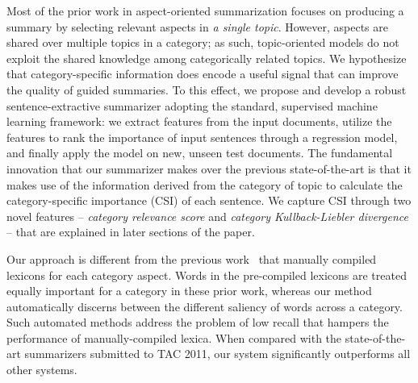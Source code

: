 Most of the prior work in aspect-oriented summarization focuses on producing a summary by selecting relevant aspects in \emph{a single topic}. However, aspects are shared over multiple topics in a category; as such, topic-oriented models do not exploit the shared knowledge among categorically related topics. We hypothesize that category-specific information does encode a useful signal that can improve the quality of guided summaries. To this effect, we propose and develop a robust sentence-extractive summarizer adopting the standard, supervised machine learning framework: we extract features from the input documents, utilize the features to rank the importance of input sentences through a regression model, and finally apply the model on new, unseen test documents.
The fundamental innovation that our summarizer makes over the previous state-of-the-art is that it makes use of the information derived from the category of topic to calculate the category-specific importance (CSI) of each sentence. We capture CSI through two novel features -- \textit{category relevance score} and \textit{category Kullback-Liebler divergence} -- that are explained in later sections of the paper.

Our approach is different from the previous work~\cite{CLASSY-TAC2010,JRC-TAC2010} that manually compiled lexicons for each category aspect. Words in the pre-compiled lexicons are treated equally important for a category in these prior work, whereas our method automatically discerns between the different saliency of words across a category. Such automated methods address the problem of low recall that hampers the performance of manually-compiled lexica. When compared with the state-of-the-art summarizers submitted to TAC 2011, our system significantly outperforms all other systems.
